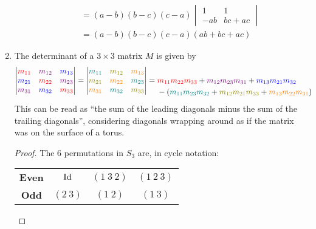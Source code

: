 \documentclass[fleqn,a4paper,11pt]{article}
\begin{document}
\begin{enumerate}[label=\textbf{\arabic*.}]
\begin{alignat*}
    && &= (a - b)(b - c)(c - a)\begin{vmatrix}
      1 & 1 \\
      -ab & bc + ac
     \end{vmatrix} \\
    && &= (a - b)(b - c)(c - a)(ab + bc + ac)
   \end{alignat*}
  \item
   \begin{lemma}
    \label{lemma_sarrus}
    The determinant of a \(3 \times 3\) matrix \(M\) is given by
    \begin{align*}
     \begin{vmatrix}
      \color{red}m_{11} & \color{violet}m_{12} & \color{blue}m_{13} \\
      \color{blue}m_{21} & \color{red}m_{22} & \color{violet}m_{23} \\
      \color{violet}m_{31} & \color{blue}m_{32} & \color{red}m_{33}
     \end{vmatrix} =
     \begin{vmatrix}
      \color{teal}m_{11} & \color{olive}m_{12} & \color{orange}m_{13} \\
      \color{olive}m_{21} & \color{orange}m_{22} & \color{teal}m_{23} \\
      \color{orange}m_{31} & \color{teal}m_{32} & \color{olive}m_{33}
     \end{vmatrix} &=
     \begin{aligned}[t]
      &  \textcolor{red}{m_{11} m_{22} m_{33}}
       + \textcolor{violet}{m_{12} m_{23} m_{31}}
       + \textcolor{blue}{m_{13} m_{21} m_{32}} \\
      &-(\textcolor{teal}{m_{11} m_{23} m_{32}}
       + \textcolor{olive}{m_{12} m_{21} m_{33}}
       + \textcolor{orange}{m_{13} m_{22} m_{31}})
     \end{aligned}
    \end{align*}
    This can be read as ``the sum of the leading diagonals minus the sum of the
    trailing diagonals'', considering diagonals wrapping around as if the matrix
    was on the surface of a torus.
   \end{lemma}
   \begin{proof}
    The 6 permutations in \(S_3\) are, in cycle notation:
    \begin{center}
     \begin{tabular}{*4c}
      \bfseries Even & \(\operatorname{Id}\) & \((1\ 3\ 2)\) & \((1\ 2\ 3)\) \\
      \bfseries Odd & \((2\ 3)\) & \((1\ 2)\) & \((1\ 3)\)

\end{tabular}
\end{center}
\end{proof}
\end{enumerate}
\end{document}
